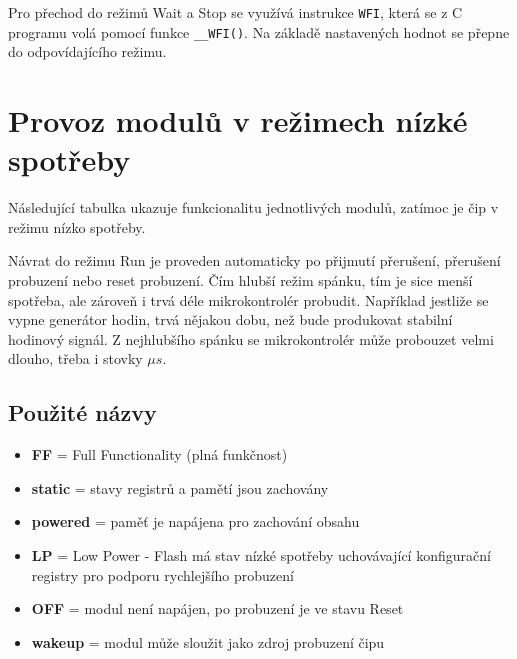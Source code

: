 \documentclass{article}
\begin{document}
Pro přechod do režimů Wait a Stop se využívá instrukce \texttt{WFI}, která se z
C programu volá pomocí funkce \texttt{\_\_WFI()}. Na základě nastavených hodnot
se přepne do odpovídajícího režimu.

\newpage
\section{Provoz modulů v režimech nízké spotřeby}

Následující tabulka ukazuje funkcionalitu jednotlivých modulů, zatímoc je čip
v režimu nízko spotřeby.

Návrat do režimu Run je proveden automaticky po přijmutí přerušení, přerušení
probuzení nebo reset probuzení. Čím hlubší režim spánku, tím je sice menší
spotřeba, ale zároveň i trvá déle mikrokontrolér probudit. Například jestliže
se vypne generátor hodin, trvá nějakou dobu, než bude produkovat stabilní
hodinový signál. Z nejhlubšího spánku se mikrokontrolér může probouzet velmi
dlouho, třeba i stovky \(\mu s\).

\subsection*{Použité názvy}
\begin{itemize}
    \item \textbf{FF} = Full Functionality (plná funkčnost)
    \item \textbf{static} = stavy registrů a pamětí jsou zachovány
    \item \textbf{powered} = paměť je napájena pro zachování obsahu
    \item \textbf{LP} = Low Power - Flash má stav nízké spotřeby uchovávající
        konfigurační registry pro podporu rychlejšího probuzení
    \item \textbf{OFF} = modul není napájen, po probuzení je ve stavu Reset
    \item \textbf{wakeup} = modul může sloužit jako zdroj probuzení čipu
\end{itemize}
\end{document}

